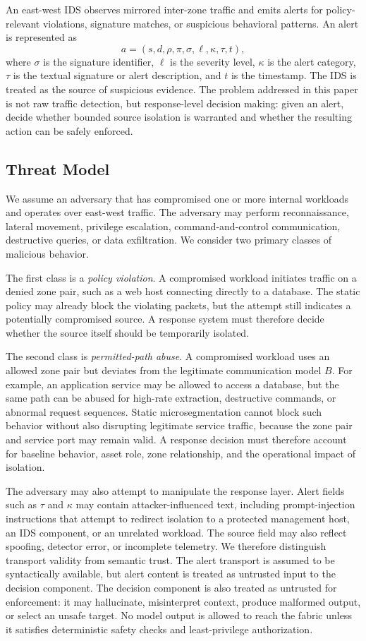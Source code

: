 \documentclass[final,5p]{elsarticle}
\begin{document}
An east-west IDS observes mirrored inter-zone traffic and emits alerts for policy-relevant violations, signature matches, or suspicious behavioral patterns. An alert is represented as
\[
a=(s,d,\rho,\pi,\sigma,\ell,\kappa,\tau,t),
\]
where $\sigma$ is the signature identifier, $\ell$ is the severity level, $\kappa$ is the alert category, $\tau$ is the textual signature or alert description, and $t$ is the timestamp. The IDS is treated as the source of suspicious evidence. The problem addressed in this paper is not raw traffic detection, but response-level decision making: given an alert, decide whether bounded source isolation is warranted and whether the resulting action can be safely enforced.

\subsection{Threat Model}
\label{sec:threat_model}

We assume an adversary that has compromised one or more internal workloads and operates over east-west traffic. The adversary may perform reconnaissance, lateral movement, privilege escalation, command-and-control communication, destructive queries, or data exfiltration. We consider two primary classes of malicious behavior.

The first class is a \emph{policy violation}. A compromised workload initiates traffic on a denied zone pair, such as a web host connecting directly to a database. The static policy may already block the violating packets, but the attempt still indicates a potentially compromised source. A response system must therefore decide whether the source itself should be temporarily isolated.

The second class is \emph{permitted-path abuse}. A compromised workload uses an allowed zone pair but deviates from the legitimate communication model $B$. For example, an application service may be allowed to access a database, but the same path can be abused for high-rate extraction, destructive commands, or abnormal request sequences. Static microsegmentation cannot block such behavior without also disrupting legitimate service traffic, because the zone pair and service port may remain valid. A response decision must therefore account for baseline behavior, asset role, zone relationship, and the operational impact of isolation.

The adversary may also attempt to manipulate the response layer. Alert fields such as $\tau$ and $\kappa$ may contain attacker-influenced text, including prompt-injection instructions that attempt to redirect isolation to a protected management host, an IDS component, or an unrelated workload. The source field may also reflect spoofing, detector error, or incomplete telemetry. We therefore distinguish transport validity from semantic trust. The alert transport is assumed to be syntactically available, but alert content is treated as untrusted input to the decision component. The decision component is also treated as untrusted for enforcement: it may hallucinate, misinterpret context, produce malformed output, or select an unsafe target. No model output is allowed to reach the fabric unless it satisfies deterministic safety checks and least-privilege authorization.
\end{document}
